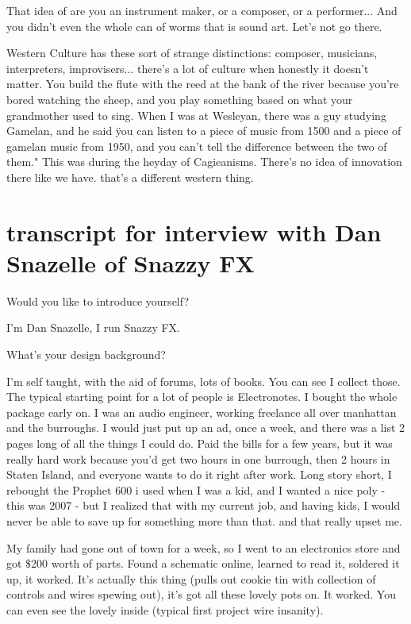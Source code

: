 That idea of are you an instrument maker, or a composer, or a performer... And you didn't even the whole can of worms that is sound art. Let's not go there. 

Western Culture has these sort of strange distinctions: composer, musicians, interpreters, improvisers... there's a lot of culture when honestly it doesn't matter. You build the flute with the reed at the bank of the river because you're bored watching the sheep, and you play something based on what your grandmother used to sing. When I was at Wesleyan, there was a guy studying Gamelan, and he said \"you can listen to a piece of music from 1500 and a piece of gamelan music from 1950, and you can't tell the difference between the two of them." This was during the heyday of Cagieanisms. There's no idea of innovation there like we have. that's a different western thing. 

\section{transcript for interview with Dan Snazelle of Snazzy FX}

Would you like to introduce yourself? 

I'm Dan Snazelle, I run Snazzy FX.

What's your design background? 

I'm self taught, with the aid of forums, lots of books. You can see I collect those. The typical starting point for a lot of people is Electronotes. I bought the whole package early on. I was an audio engineer, working freelance all over manhattan and the burroughs. I would just put up an ad, once a week, and there was a list 2 pages long of all the things I could do. Paid the bills for a few years, but it was really hard work because you'd get two hours in one burrough, then 2 hours in Staten Island, and everyone wants to do it right after work. Long story short, I rebought the Prophet 600 i used when I was a kid, and I wanted a nice poly - this was 2007 - but I realized that with my current job, and having kids, I would never be able to save up for something more than that. and that really upset me. 

My family had gone out of town for a week, so I went to an electronics store and got \$200 worth of parts. Found a schematic online, learned to read it, soldered it up, it worked. It's actually this thing (pulls out cookie tin with collection of controls and wires spewing out), it's got all these lovely pots on. It worked. You can even see the lovely inside (typical first project wire insanity). 

